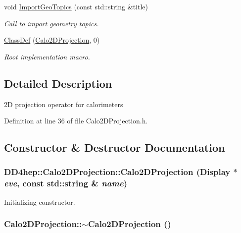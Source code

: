 \begin{DoxyCompactItemize}
void \hyperlink{class_d_d4hep_1_1_calo2_d_projection_ae4b76bf31fd029d99cece5e9f2df8937}{ImportGeoTopics} (const std::string \&title)
\begin{DoxyCompactList}\small\item\em Call to import geometry topics. \item\end{DoxyCompactList}\item 
\hyperlink{class_d_d4hep_1_1_calo2_d_projection_a27b84375acec854d3c3fedba3519b7f4}{ClassDef} (\hyperlink{class_d_d4hep_1_1_calo2_d_projection}{Calo2DProjection}, 0)
\begin{DoxyCompactList}\small\item\em Root implementation macro. \item\end{DoxyCompactList}\end{DoxyCompactItemize}


\subsection{Detailed Description}
2D projection operator for calorimeters 

Definition at line 36 of file Calo2DProjection.h.

\subsection{Constructor \& Destructor Documentation}
\hypertarget{class_d_d4hep_1_1_calo2_d_projection_a80436525b8087ffb14aa82b06b8059cb}{
\subsubsection[{Calo2DProjection}]{\setlength{\rightskip}{0pt plus 5cm}DD4hep::Calo2DProjection::Calo2DProjection ({\bf Display} $\ast$ {\em eve}, \/  const std::string \& {\em name})}}
\label{class_d_d4hep_1_1_calo2_d_projection_a80436525b8087ffb14aa82b06b8059cb}


Initializing constructor. \hypertarget{class_d_d4hep_1_1_calo2_d_projection_a955a146f1ac77e119979af591dd3fe71}{
\subsubsection[{$\sim$Calo2DProjection}]{\setlength{\rightskip}{0pt plus 5cm}Calo2DProjection::$\sim$Calo2DProjection ()}}
\label{class_d_d4hep_1_1_calo2_d_projection_a955a146f1ac77e119979af591dd3fe71}


